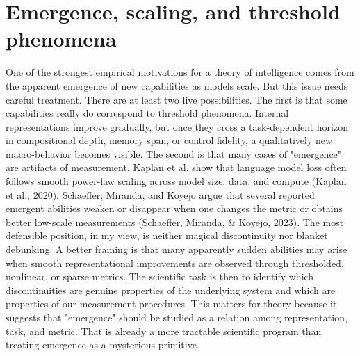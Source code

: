 \documentclass[11pt]{article}
\newcommand{\citejump}[2]{\hyperref[#1]{(#2)}}
\begin{document}
\section{Emergence, scaling, and threshold phenomena}
One of the strongest empirical motivations for a theory of intelligence comes from the apparent emergence of new capabilities as models scale. But this issue needs careful treatment. There are at least two live possibilities. The first is that some capabilities really do correspond to threshold phenomena. Internal representations improve gradually, but once they cross a task-dependent horizon in compositional depth, memory span, or control fidelity, a qualitatively new macro-behavior becomes visible. The second is that many cases of "emergence" are artifacts of measurement. Kaplan et al. show that language model loss often follows smooth power-law scaling across model size, data, and compute \citejump{ref:kaplan2020}{Kaplan et al., 2020}. Schaeffer, Miranda, and Koyejo argue that several reported emergent abilities weaken or disappear when one changes the metric or obtains better low-scale measurements \citejump{ref:schaeffer2023}{Schaeffer, Miranda, \& Koyejo, 2023}. The most defensible position, in my view, is neither magical discontinuity nor blanket debunking. A better framing is that many apparently sudden abilities may arise when smooth representational improvements are observed through thresholded, nonlinear, or sparse metrics. The scientific task is then to identify which discontinuities are genuine properties of the underlying system and which are properties of our measurement procedures. This matters for theory because it suggests that "emergence" should be studied as a relation among representation, task, and metric. That is already a more tractable scientific program than treating emergence as a mysterious primitive.
\end{document}
